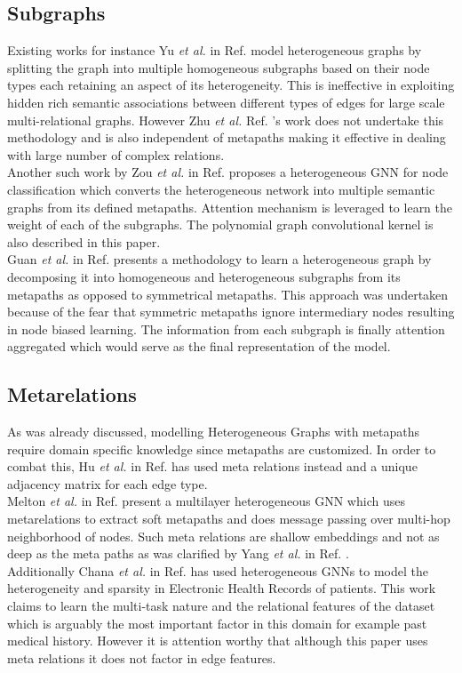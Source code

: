 \documentclass{report} %
\begin{document}
\subsection{Subgraphs}\label{subsec:HGNN Subgraphs}
Existing works for instance Yu \textit{et al.} in Ref. \cite{PR-HGNN-2024} model heterogeneous graphs by splitting the graph into multiple 
homogeneous subgraphs based on their node types each retaining an aspect of its heterogeneity.
This is ineffective in exploiting hidden rich semantic associations between different types of edges for large scale multi-relational graphs.
However Zhu \textit{et al.} Ref. \cite{RSHGNN-2019}'s work does not undertake this methodology and is also independent of metapaths making it effective 
in dealing with large number of complex relations.\\
Another such work by Zou \textit{et al.} in Ref. \cite{HNNC-2023} proposes a heterogeneous \ac{GNN} for node classification which converts the 
heterogeneous network into multiple semantic graphs from its defined metapaths. Attention mechanism is leveraged to learn the weight of each of the subgraphs. 
The polynomial graph convolutional kernel is also described in this paper.\\ 
Guan \textit{et al.} in Ref. \cite{HGNNSG-2023} presents a methodology to learn a heterogeneous graph by decomposing it into homogeneous and heterogeneous subgraphs from its metapaths 
as opposed to symmetrical metapaths. This approach was undertaken because of the fear that symmetric metapaths ignore intermediary nodes resulting in node biased learning. 
The information from each subgraph is finally attention aggregated which would serve as the final representation of the model.

\subsection{Metarelations}\label{subsec:HGNN Metarelations}
As was already discussed, modelling Heterogeneous Graphs with metapaths require domain specific knowledge since metapaths are customized. 
In order to combat this, Hu \textit{et al.} in Ref. \cite{HGT-2022} has used meta relations instead and a unique adjacency matrix for each edge type.\\
Melton \textit{et al.} in Ref. \cite{MHGNN-2023} present a multilayer heterogeneous \ac{GNN} which uses metarelations to extract soft metapaths 
and does message passing over multi-hop neighborhood of nodes.
Such meta relations are shallow embeddings and not as deep as the meta paths as was clarified by Yang \textit{et al.} in Ref. \cite{HGNN-2020}. \\
Additionally Chana \textit{et al.} in Ref. \cite{EHR HGNN-2024} has used heterogeneous \ac{GNN}s to model the heterogeneity and sparsity in Electronic 
Health Records of patients. This work claims to learn the multi-task nature and  the relational features of the dataset which is arguably the most important factor in 
this domain for example past medical history. However it is attention worthy that although this paper uses meta relations it does not factor in edge features.\\
\end{document}
